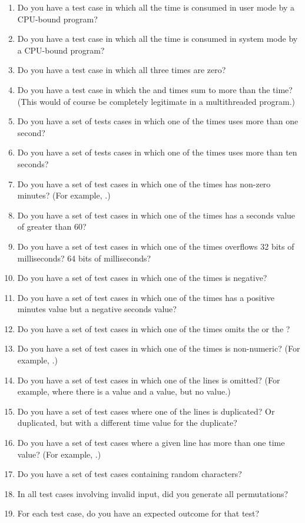 {	\begin{enumerate}
	\item	Do you have a test case in which all the time is
		consumed in user mode by a CPU-bound program?
	\item	Do you have a test case in which all the time is
		consumed in system mode by a CPU-bound program?
	\item	Do you have a test case in which all three times
		are zero?
	\item	Do you have a test case in which the  and 
		times sum to more than the  time?
		(This would of course be completely legitimate in
		a multithreaded program.)
	\item	Do you have a set of tests cases in which one of the
		times uses more than one second?
	\item	Do you have a set of tests cases in which one of the
		times uses more than ten seconds?
	\item	Do you have a set of test cases in which one of the
		times has non-zero minutes?
		(For example, .)
	\item	Do you have a set of test cases in which one of the
		times has a seconds value of greater than 60?
	\item	Do you have a set of test cases in which one of the
		times overflows 32 bits of milliseconds?
		64 bits of milliseconds?
	\item	Do you have a set of test cases in which one of the
		times is negative?
	\item	Do you have a set of test cases in which one of the
		times has a positive minutes value but a negative
		seconds value?
	\item	Do you have a set of test cases in which one of the
		times omits the  or the ?
	\item	Do you have a set of test cases in which one of the
		times is non-numeric?
		(For example, .)
	\item	Do you have a set of test cases in which one of the
		lines is omitted?
		(For example, where there is a  value and
		a  value, but no  value.)
	\item	Do you have a set of test cases where one of the
		lines is duplicated?
		Or duplicated, but with a different time value for
		the duplicate?
	\item	Do you have a set of test cases where a given line
		has more than one time value?
		(For example, .)
	\item	Do you have a set of test cases containing random
		characters?
	\item	In all test cases involving invalid input, did you
		generate all permutations?
	\item	For each test case, do you have an expected outcome
		for that test?
	\end{enumerate}

}
